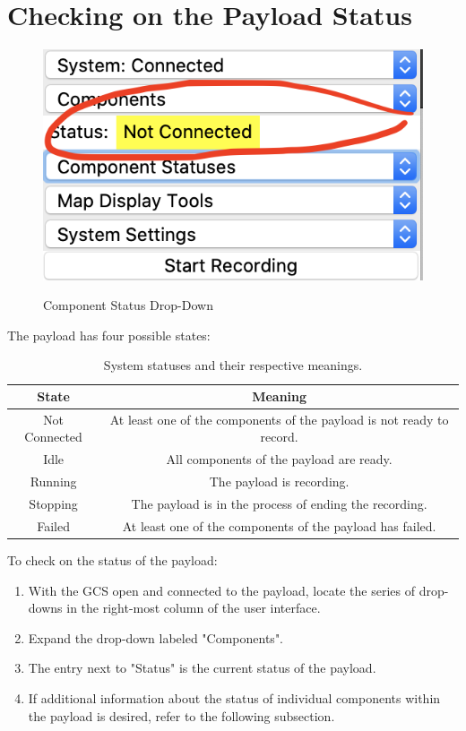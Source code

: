 \documentclass{report}
\begin{document}
	\section{Checking on the Payload Status}
		\begin{figure}[htb]
			\centering
			\caption{Component Status Drop-Down}
			\includegraphics[scale=0.5]{component_status_dd.jpg}
			\label{fig:component_status_dd}
		\end{figure}
		The payload has four possible states: 
		\begin{table}[htb]
			\centering
			\caption{System statuses and their respective meanings.}
			\begin{tabular}{||c c||}
			\hline
			State & Meaning\\ [0.5ex]
			\hline\hline
			Not Connected & At least one of the components of the payload is not ready to record. \\
			\hline
			Idle & All components of the payload are ready. \\
			\hline
			Running & The payload is recording. \\
			\hline
			Stopping & The payload is in the process of ending the recording. \\
			\hline
			Failed & At least one of the components of the payload has failed. \\ [1ex]
			\hline
			\end{tabular}
		\end{table}
		To check on the status of the payload:
		\begin{enumerate}
			\item With the GCS open and connected to the payload, locate the series of drop-downs in the right-most column of the user interface.
			\item Expand the drop-down labeled "Components".
			\item The entry next to "Status" is the current status of the payload.
			\item If additional information about the status of individual components within the payload is desired, refer to the following subsection.
		\end{enumerate}
\end{document}

